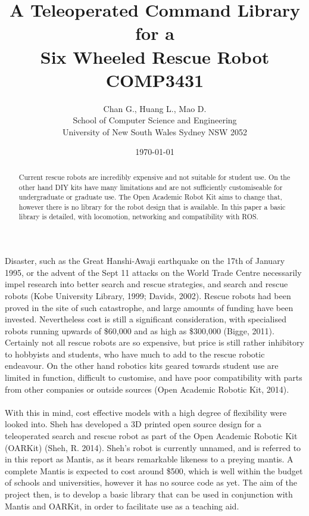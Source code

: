 \documentclass[]{article}
\title{A Teleoperated Command Library for a \\ Six Wheeled Rescue Robot \\ COMP3431}
\author{Chan G., Huang L., Mao D.\\
\small School of Computer Science and Engineering\\[-0.8ex]
\small University of New South Wales Sydney NSW 2052}
\date{\today}
\begin{document}
\maketitle %

\begin{abstract}
Current rescue robots are incredibly expensive and not suitable for student use. On the other hand DIY kits have many limitations and are not sufficiently customiseable for undergraduate or graduate use. The Open Academic Robot Kit aims to change that, however there is no library for the robot design that is available. In this paper a basic library is detailed, with locomotion, networking and compatibility with ROS.
\end{abstract}

\section{}
Disaster, such as the Great Hanshi-Awaji earthquake on the 17th of January 1995, or the advent of the Sept 11 attacks on the World Trade Centre necessarily impel research into better search and rescue strategies, and search and rescue robots (Kobe University Library, 1999; Davids, 2002). Rescue robots had been proved in the site of such catastrophe, and large amounts of funding have been invested. Nevertheless cost is still a significant consideration, with specialised robots running upwards of \$60,000 and as high as \$300,000 (Bigge, 2011). Certainly not all rescue robots are so expensive, but price is still rather inhibitory to hobbyists and students, who have much to add to the rescue robotic endeavour. On the other hand robotics kits geared towards student use are limited in function, difficult to customise, and have poor compatibility with parts from other companies or outside sources (Open Academic Robotic Kit, 2014).
\\
\\
With this in mind, cost effective models with a high degree of flexibility were looked into. Sheh has developed a 3D printed open source design for a teleoperated search and rescue robot as part of the Open Academic Robotic Kit (OARKit) (Sheh, R. 2014). Sheh's robot is currently unnamed, and is referred to in this report as Mantis, as it bears remarkable likeness to a preying mantis. A complete Mantis is expected to cost around \$500, which is well within the budget of schools and universities, however it has no source code as yet. The aim of the project then, is to develop a basic library that can be used in conjunction with Mantis and OARKit, in order to facilitate use as a teaching aid.
\end{document}
